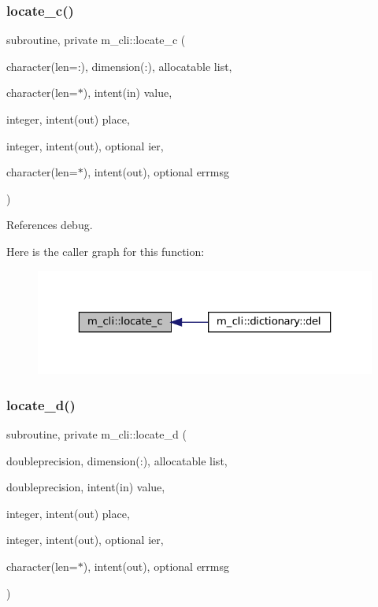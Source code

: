 \subsubsection{\texorpdfstring{locate\+\_\+c()}{locate\_c()}}
{\footnotesize\ttfamily subroutine, private m\+\_\+cli\+::locate\+\_\+c (\begin{DoxyParamCaption}\item[{character(len=\+:), dimension(\+:), allocatable}]{list,  }\item[{character(len=$\ast$), intent(in)}]{value,  }\item[{integer, intent(out)}]{place,  }\item[{integer, intent(out), optional}]{ier,  }\item[{character(len=$\ast$), intent(out), optional}]{errmsg }\end{DoxyParamCaption})\hspace{0.3cm}{\ttfamily [private]}}



References debug.

Here is the caller graph for this function\+:
\nopagebreak
\begin{figure}[H]
\begin{center}
\leavevmode
\includegraphics[width=323pt]{namespacem__cli_ade3d1e36f0fc6a47b5469dcd8ade5312_icgraph}
\end{center}
\end{figure}
\mbox{\label{namespacem__cli_a4187c24a2abf5cc630232965637493e8}} 
\subsubsection{\texorpdfstring{locate\+\_\+d()}{locate\_d()}}
{\footnotesize\ttfamily subroutine, private m\+\_\+cli\+::locate\+\_\+d (\begin{DoxyParamCaption}\item[{doubleprecision, dimension(\+:), allocatable}]{list,  }\item[{doubleprecision, intent(in)}]{value,  }\item[{integer, intent(out)}]{place,  }\item[{integer, intent(out), optional}]{ier,  }\item[{character(len=$\ast$), intent(out), optional}]{errmsg }\end{DoxyParamCaption})\hspace{0.3cm}{\ttfamily [private]}}



